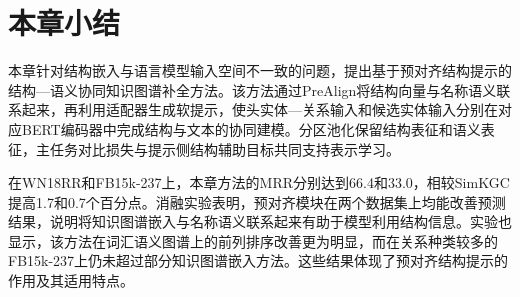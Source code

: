 \section{本章小结}

本章针对结构嵌入与语言模型输入空间不一致的问题，提出基于预对齐结构提示的结构—语义协同知识图谱补全方法。该方法通过PreAlign将结构向量与名称语义联系起来，再利用适配器生成软提示，使头实体—关系输入和候选实体输入分别在对应BERT编码器中完成结构与文本的协同建模。分区池化保留结构表征和语义表征，主任务对比损失与提示侧结构辅助目标共同支持表示学习。

在WN18RR和FB15k-237上，本章方法的MRR分别达到66.4和33.0，相较SimKGC提高1.7和0.7个百分点。消融实验表明，预对齐模块在两个数据集上均能改善预测结果，说明将知识图谱嵌入与名称语义联系起来有助于模型利用结构信息。实验也显示，该方法在词汇语义图谱上的前列排序改善更为明显，而在关系种类较多的FB15k-237上仍未超过部分知识图谱嵌入方法。这些结果体现了预对齐结构提示的作用及其适用特点。
